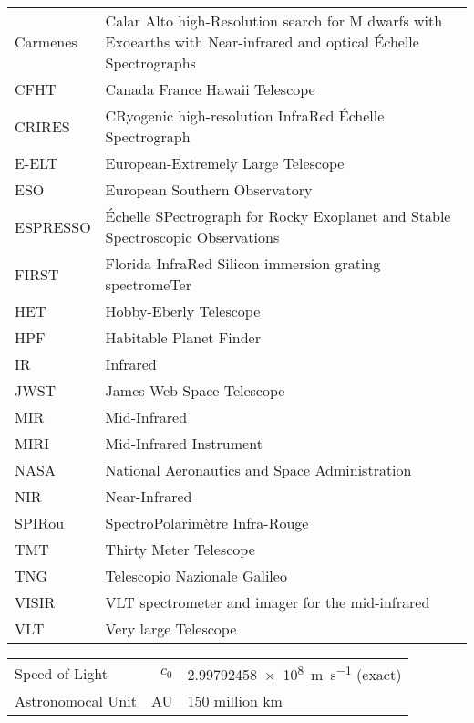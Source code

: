 \documentclass[fleqn]{fcup-thesis}
\begin{document}
\begin{preliminary}
\begin{abbreviations}
\begin{longtable}{ll}
				Carmenes & Calar Alto high-Resolution search for M dwarfs with Exoearths with Near-infrared and optical \'Echelle Spectrographs \\
				CFHT & Canada France Hawaii Telescope \\
				CRIRES & CRyogenic high-resolution InfraRed \'Echelle Spectrograph \\
				E-ELT & European-Extremely Large Telescope \\
				ESO & European Southern Observatory \\
				ESPRESSO & \'Echelle SPectrograph for Rocky Exoplanet and Stable Spectroscopic Observations\\
				FIRST & Florida InfraRed Silicon immersion grating spectromeTer \\
				HET & Hobby-Eberly Telescope \\
				HPF & Habitable Planet Finder \\
				IR & Infrared\\
				JWST & James Web Space Telescope \\
				MIR & Mid-Infrared \\
				MIRI & Mid-Infrared Instrument\\
				NASA & National Aeronautics and Space Administration \\
				NIR & Near-Infrared \\
				SPIRou & SpectroPolarim\`etre Infra-Rouge\\
				TMT & Thirty Meter Telescope\\
				TNG & Telescopio Nazionale Galileo \\
				VISIR &  VLT spectrometer and imager for the mid-infrared \\
				VLT & Very large Telescope \\
				
			\end{longtable}		
		\end{abbreviations}
		
		\begin{constants}
			\begin{longtable}{lr@{${}={}$}l}
				 
				 Speed of Light & $c_{0}$ & \SI{2.99792458e8}{\meter\per\second} (exact)\\
				 Astronomocal Unit & AU & 150 million km\\
			\end{longtable}
		\end{constants}
		

\end{preliminary}
\end{document}
